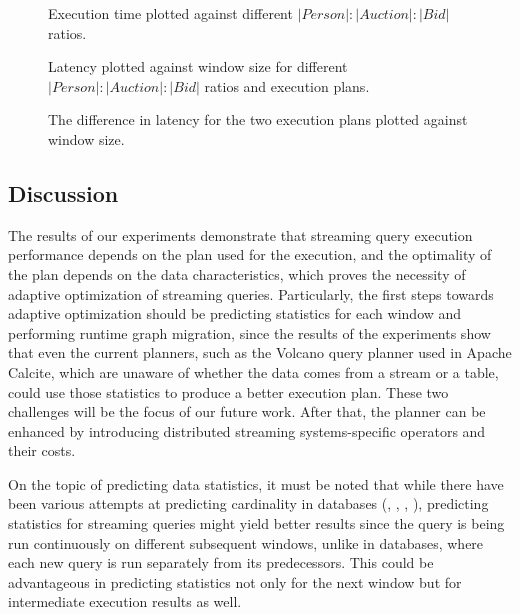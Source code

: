 
\begin{figure}
\centering

\caption{Execution time plotted against different $|Person|:|Auction|:|Bid|$ ratios.} %
\label{fig:execution_time_against_distributions}
\end{figure}


\begin{figure}
\centering

\caption{Latency plotted against window size for different $|Person|:|Auction|:|Bid|$ ratios and execution plans.}
\label{fig:latency_against_window_size}
\end{figure}


\begin{figure}
\centering

\caption{The difference in latency for the two execution plans plotted against window size.}

\label{fig:latency_diff_against_window_size}
\end{figure}



\subsection{Discussion}

The results of our experiments demonstrate that streaming query execution performance depends on the plan used for the execution, and the optimality of the plan depends on the data characteristics, which proves the necessity of adaptive optimization of streaming queries. Particularly, the first steps towards adaptive optimization should be predicting statistics for each window and performing runtime graph migration, since the results of the experiments show that even the current planners, such as the Volcano query planner used in Apache Calcite, which are unaware of whether the data comes from a stream or a table, could use those statistics to produce a better execution plan. These two challenges will be the focus of our future work. After that, the planner can be enhanced by introducing distributed streaming systems-specific operators and their costs.

On the topic of predicting data statistics, it must be noted that while there have been various attempts at predicting cardinality in databases (\cite{liu2015cardinality}, \cite{kipf2018learned}, \cite{ortiz2019empirical}, \cite{CHEN20211047}), predicting statistics for streaming queries might yield better results since the query is being run continuously on different subsequent windows, unlike in databases, where each new query is run separately from its predecessors. This could be advantageous in predicting statistics not only for the next window but for intermediate execution results as well.


